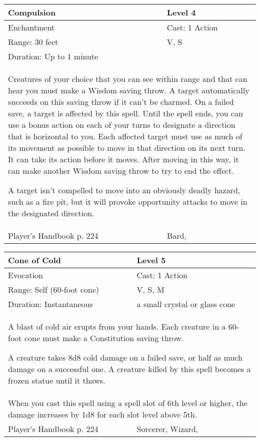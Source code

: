 \documentclass[11pt]{report}
\begin{document}
\begin{table}[H]
	\begin{tabular}{||p{6cm}|p{6cm}||}
		\hline\hline
		\bf{Compulsion} & Level 4\\ \hline
		Enchantment & Cast: 1 Action\\ \hline
		Range: 30 feet & V, S\\ \hline
		Duration: Up to 1 minute & \\ \hline
		\multicolumn{2}{||p{12cm}||}{Creatures of your choice that you can see within range and that can hear you must make a Wisdom saving throw. 
A target automatically succeeds on this saving throw if it can’t be charmed. On a failed save, a target is affected by this spell. Until the spell ends, you can use a bonus action on each of your turns to designate a direction that is horizontal to you. Each affected target must use as much of its movement as possible to move in that direction on its next turn. It can take its action before it moves. After moving in this way, it can make another Wisdom saving throw to try to end the effect. 

A target isn’t compelled to move into an obviously deadly hazard, such as a fire pit, but it will provoke opportunity attacks to move in the designated direction.}\\ \hline
Player's Handbook p. 224 & Bard, \\ \hline\hline
	\end{tabular}
\end{table}

\begin{table}[H]
	\begin{tabular}{||p{6cm}|p{6cm}||}
		\hline\hline
		\bf{Cone of Cold} & Level 5\\ \hline
		Evocation & Cast: 1 Action\\ \hline
		Range: Self (60-foot cone) & V, S, M \\ \hline
		Duration: Instantaneous & a small crystal or glass cone\\ \hline
		\multicolumn{2}{||p{12cm}||}{A blast of cold air erupts from your hands. 
Each creature in a 60-foot cone must make a Constitution saving throw. 

A creature takes 8d8 cold damage on a failed save, or half as much damage on a successful one. A creature killed by this spell becomes a frozen statue until it thaws.}\\ \hline
		\multicolumn{2}{||p{12cm}||}{When you cast this spell using a spell slot of 6th level or higher, the damage increases by 1d8 for each slot level above 5th.}\\ \hline
Player's Handbook p. 224 & Sorcerer, Wizard, \\ \hline\hline
	\end{tabular}
\end{table}
\end{document}
